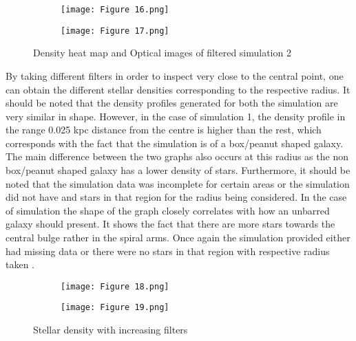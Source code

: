 \documentclass[12pt, a4paper]{article}
\begin{document}
\begin{figure}[H]
  \centering
  \begin{subfigure}{.5\textwidth}
    \centering
    \texttt{[image: Figure 16.png]}
    \label{fig:filter_height_heat_map_2}
  \end{subfigure}%
  \begin{subfigure}{.5\textwidth}
    \centering
    \texttt{[image: Figure 17.png]}
    \label{fig:filter_height_optical_2}
  \end{subfigure}
  \caption{Density heat map and Optical images of filtered simulation 2}
  \label{fig:filter_height_com_2}
\end{figure}

By taking different filters in order to inspect very close to the central point, one can obtain the different stellar densities corresponding to the respective radius. It should be noted that the density profiles generated for both the simulation are very similar in shape. However, in the case of simulation 1, the density profile in the range 0.025 kpc distance from the centre is higher than the rest, which corresponds with the fact that the simulation is of a box/peanut shaped galaxy. The main difference between the two graphs also occurs at this radius as the non box/peanut shaped galaxy has a lower density of stars. Furthermore, it should be noted that the simulation data was incomplete for certain areas or the simulation did not have and stars in that region for the radius being considered. In the case of simulation the shape of the graph closely correlates with how an unbarred galaxy should present. It shows the fact that there are more stars towards the central bulge rather in the spiral arms. Once again the simulation provided either had missing data or there were no stars in that region with respective radius taken \parencite{berghTenBillionYears2002}.

\begin{figure}[H]
  \centering
  \begin{subfigure}{.5\textwidth}
    \centering
    \texttt{[image: Figure 18.png]}
    \label{fig:stellar_denisty_1}
  \end{subfigure}%
  \begin{subfigure}{.5\textwidth}
    \centering
    \texttt{[image: Figure 19.png]}
    \label{fig:stellar_density_2}
  \end{subfigure}
  \caption{Stellar density with increasing filters}
  \label{fig:Combined_stellar_denisty}
\end{figure}
\end{document}
